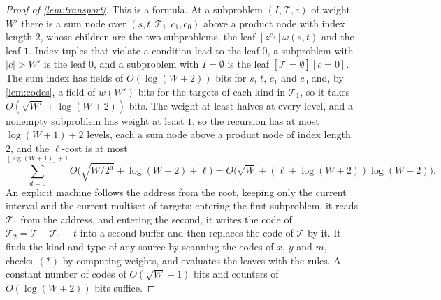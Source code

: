 \documentclass[11pt]{article}
\theoremstyle{definition}
\theoremstyle{definition}
\theoremstyle{remark}
\begin{document}
\begin{proof}[Proof of \cref{lem:transport}]
This is a formula. At a subproblem $(I,\mathcal T,c)$ of weight $W'$ there is a sum node over $(s,t,\mathcal T_1,c_1,c_0)$ above a product node with index length $2$, whose children are the two subproblems, the leaf $[z^{c_0}]\omega(s,t)$ and the leaf $1$. Index tuples that violate a condition lead to the leaf $0$, a subproblem with $|c|>W'$ is the leaf $0$, and a subproblem with $I=\emptyset$ is the leaf $[\mathcal T=\emptyset][c=0]$. The sum index has fields of $O(\log(W+2))$ bits for $s$, $t$, $c_1$ and $c_0$ and, by \cref{lem:codes}, a field of $w(W')$ bits for the targets of each kind in $\mathcal T_1$, so it takes $O(\sqrt{W'}+\log(W+2))$ bits. The weight at least halves at every level, and a nonempty subproblem has weight at least $1$, so the recursion has at most $\log(W+1)+2$ levels, each a sum node above a product node of index length $2$, and the $\ell$-cost is at most
\[
\sum_{d=0}^{\lfloor\log(W+1)\rfloor+1}O\bigl(\sqrt{W/2^d}+\log(W+2)+\ell\bigr)=O\bigl(\sqrt W+(\ell+\log(W+2))\log(W+2)\bigr).
\]
An explicit machine follows the address from the root, keeping only the current interval and the current multiset of targets: entering the first subproblem, it reads $\mathcal T_1$ from the address, and entering the second, it writes the code of $\mathcal T_2=\mathcal T-\mathcal T_1-t$ into a second buffer and then replaces the code of $\mathcal T$ by it. It finds the kind and type of any source by scanning the codes of $x$, $y$ and $m$, checks~$(*)$ by computing weights, and evaluates the leaves with the rules. A constant number of codes of $O(\sqrt W+1)$ bits and counters of $O(\log(W+2))$ bits suffice.
\end{proof}
\end{document}
